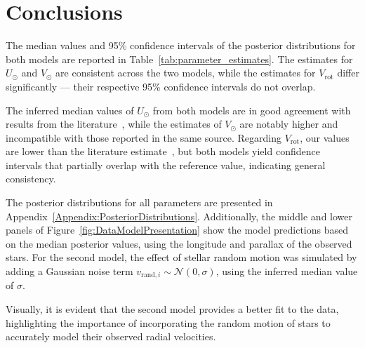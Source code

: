 \section{Conclusions}

The median values and 95\% confidence intervals of the posterior distributions for both models are reported in Table~\ref{tab:parameter_estimates}. The estimates for $U_\odot$ and $V_\odot$ are consistent across the two models, while the estimates for $V_{\text{rot}}$ differ significantly — their respective 95\% confidence intervals do not overlap.

The inferred median values of $U_\odot$ from both models are in good agreement with results from the literature~\cite{LocalKinematics}, while the estimates of $V_\odot$ are notably higher and incompatible with those reported in the same source. Regarding $V_{\text{rot}}$, our values are lower than the literature estimate~\cite{GalacticKinematics}, but both models yield confidence intervals that partially overlap with the reference value, indicating general consistency.

The posterior distributions for all parameters are presented in Appendix~\ref{Appendix:PosteriorDistributions}. Additionally, the middle and lower panels of Figure~\ref{fig:DataModelPresentation} show the model predictions based on the median posterior values, using the longitude and parallax of the observed stars. For the second model, the effect of stellar random motion was simulated by adding a Gaussian noise term $v_{\text{rand}, i} \sim \mathcal{N}(0, \sigma)$, using the inferred median  value of $\sigma$.

Visually, it is evident that the second model provides a better fit to the data, highlighting the importance of incorporating the random motion of stars to accurately model their observed radial velocities.

